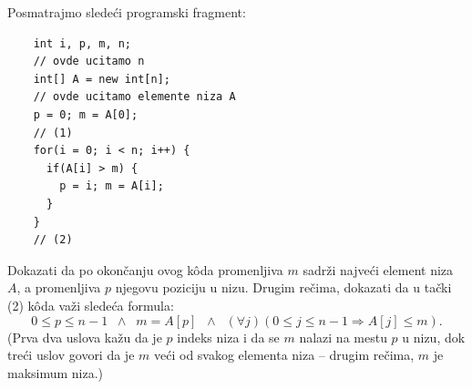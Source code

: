 \begin{EX}\label{ft05.ex.max-niza}
  Posmatrajmo slede\'ci programski fragment:
{\small
\begin{verbatim}
    int i, p, m, n;
    // ovde ucitamo n
    int[] A = new int[n];
    // ovde ucitamo elemente niza A
    p = 0; m = A[0];
    // (1)
    for(i = 0; i < n; i++) {
      if(A[i] > m) {
        p = i; m = A[i];
      }
    }
    // (2)
\end{verbatim}
}
\noindent
  Dokazati da po okon\v canju ovog k\^oda promenljiva $m$ sadr\v zi najve\'ci element niza~$A$, a promenljiva $p$ njegovu
  poziciju u nizu. Drugim re\v cima, dokazati da u ta\v cki (2) k\^oda va\v zi slede\'ca formula:
  $$
    0 \le p \le n - 1 \;\;\land\;\; m = A[p] \;\;\land\;\; (\forall j)(0 \le j \le n - 1 \Rightarrow A[j] \le m).
  $$
  (Prva dva uslova ka\v zu da je $p$ indeks niza i da se $m$ nalazi na mestu $p$ u nizu, dok tre\'ci uslov govori da je
  $m$ ve\'ci od svakog elementa niza -- drugim re\v cima, $m$ je maksimum niza.)
\end{EX}
